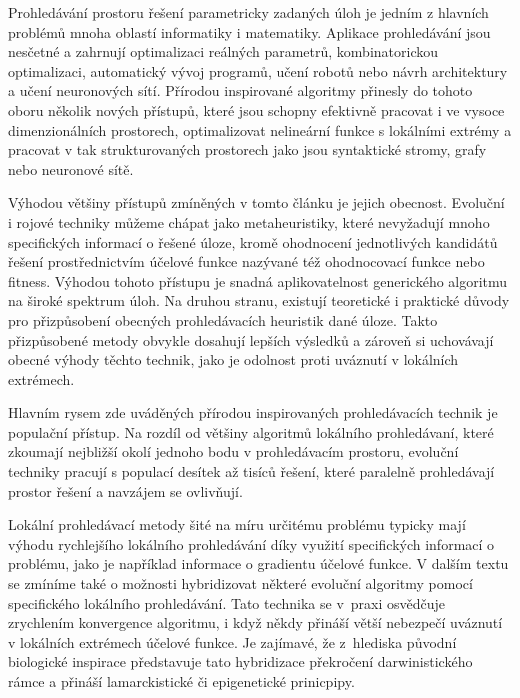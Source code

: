 
Prohledávání prostoru řešení parametricky zadaných úloh je jedním z hlavních problémů mnoha oblastí informatiky i matematiky. Aplikace prohledávání jsou nesčetné a zahrnují optimalizaci reálných parametrů, kombinatorickou optimalizaci, automatický vývoj programů, učení robotů nebo návrh architektury a učení neuronových sítí. Přírodou inspirované algoritmy přinesly do tohoto oboru několik nových přístupů, které jsou schopny efektivně pracovat i ve vysoce dimenzionálních prostorech, optimalizovat nelineární funkce s lokálními extrémy a pracovat v tak strukturovaných prostorech jako jsou syntaktické stromy, grafy nebo neuronové sítě. 

Výhodou většiny přístupů zmíněných v tomto článku je jejich obecnost. Evoluční i rojové techniky můžeme chápat jako metaheuristiky, které nevyžadují mnoho specifických informací o řešené úloze, kromě ohodnocení jednotlivých kandidátů řešení prostřednictvím účelové funkce nazývané též ohodnocovací funkce nebo fitness. Výhodou tohoto přístupu je snadná aplikovatelnost generického algoritmu na široké spektrum úloh. Na druhou stranu, existují teoretické i praktické důvody pro přizpůsobení obecných prohledávacích heuristik dané úloze. Takto přizpůsobené metody obvykle dosahují lepších výsledků a zároveň si uchovávají obecné výhody těchto technik, jako je odolnost proti uváznutí v lokálních extrémech. 

Hlavním rysem zde uváděných přírodou inspirovaných prohledávacích technik je populační přístup. Na rozdíl od většiny algoritmů lokálního prohledávaní, které zkoumají nejbližší okolí jednoho bodu v prohledávacím prostoru, evoluční techniky pracují s populací desítek až tisíců řešení, které paralelně prohledávají prostor řešení a navzájem se ovlivňují. 

Lokální prohledávací metody šité na míru určitému problému typicky mají výhodu rychlejšího lokálního prohledávání díky využití specifických informací o problému, jako je například informace o gradientu účelové funkce. V dalším textu se zmíníme také o možnosti hybridizovat některé evoluční algoritmy pomocí specifického lokálního prohledávání. Tato technika se v~praxi osvědčuje zrychlením konvergence algoritmu, i když někdy přináší větší nebezpečí uváznutí v lokálních extrémech účelové funkce. Je zajímavé, že z~hlediska původní biologické inspirace představuje tato hybridizace překročení darwinistického rámce a přináší lamarckistické či epigenetické prinicpipy. 

